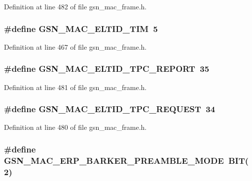 Definition at line 482 of file gsn\_\-mac\_\-frame.h.

\hypertarget{a00523_a9520497625163f70d0bbbd0b4a5b728d}{
\subsubsection[{GSN\_\-MAC\_\-ELTID\_\-TIM}]{\setlength{\rightskip}{0pt plus 5cm}\#define GSN\_\-MAC\_\-ELTID\_\-TIM~5}}
\label{a00523_a9520497625163f70d0bbbd0b4a5b728d}


Definition at line 467 of file gsn\_\-mac\_\-frame.h.

\hypertarget{a00523_a4aefd4b7c9e47964d6f2f6e0a756387b}{
\subsubsection[{GSN\_\-MAC\_\-ELTID\_\-TPC\_\-REPORT}]{\setlength{\rightskip}{0pt plus 5cm}\#define GSN\_\-MAC\_\-ELTID\_\-TPC\_\-REPORT~35}}
\label{a00523_a4aefd4b7c9e47964d6f2f6e0a756387b}


Definition at line 481 of file gsn\_\-mac\_\-frame.h.

\hypertarget{a00523_a11dd89531485dd050368ebc7b1beeecf}{
\subsubsection[{GSN\_\-MAC\_\-ELTID\_\-TPC\_\-REQUEST}]{\setlength{\rightskip}{0pt plus 5cm}\#define GSN\_\-MAC\_\-ELTID\_\-TPC\_\-REQUEST~34}}
\label{a00523_a11dd89531485dd050368ebc7b1beeecf}


Definition at line 480 of file gsn\_\-mac\_\-frame.h.

\hypertarget{a00523_ac2dc3d7dab46e5b1effe0581d070da22}{
\subsubsection[{GSN\_\-MAC\_\-ERP\_\-BARKER\_\-PREAMBLE\_\-MODE}]{\setlength{\rightskip}{0pt plus 5cm}\#define GSN\_\-MAC\_\-ERP\_\-BARKER\_\-PREAMBLE\_\-MODE~BIT(2)}}
\label{a00523_ac2dc3d7dab46e5b1effe0581d070da22}


